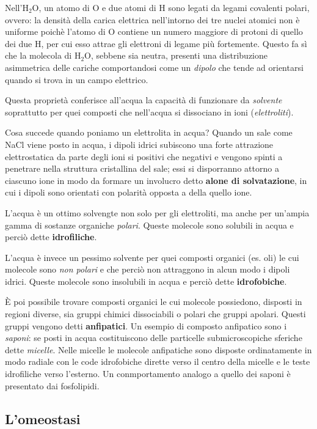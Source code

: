 \documentclass[]{article}
\begin{document}
Nell'H\(_2\)O, un atomo di O e due atomi di H sono legati da legami
covalenti polari, ovvero: la densità della carica elettrica nell'intorno
dei tre nuclei atomici non è uniforme poichè l'atomo di O contiene un
numero maggiore di protoni di quello dei due H, per cui esso attrae gli
elettroni di legame più fortemente. Questo fa sì che la molecola di
H\(_2\)O, sebbene sia neutra, presenti una distribuzione asimmetrica
delle cariche comportandosi come un \emph{dipolo} che tende ad
orientarsi quando si trova in un campo elettrico.

Questa proprietà conferisce all'acqua la capacità di funzionare da
\emph{solvente} soprattutto per quei composti che nell'acqua si
dissociano in ioni (\emph{elettroliti}).

Cosa succede quando poniamo un elettrolita in acqua? Quando un sale come
NaCl viene posto in acqua, i dipoli idrici subiscono una forte
attrazione elettrostatica da parte degli ioni si positivi che negativi e
vengono spinti a penetrare nella struttura cristallina del sale; essi si
disporranno attorno a ciascuno ione in modo da formare un involucro
detto \textbf{alone di solvatazione}, in cui i dipoli sono orientati con
polarità opposta a della quello ione.

L'acqua è un ottimo solvengte non solo per gli elettroliti, ma anche per
un'ampia gamma di sostanze organiche \emph{polari}. Queste molecole sono
solubili in acqua e perciò dette \textbf{idrofiliche}.

L'acqua è invece un pessimo solvente per quei composti organici (es.
oli) le cui molecole sono \emph{non polari} e che perciò non attraggono
in alcun modo i dipoli idrici. Queste molecole sono insolubili in acqua
e perciò dette \textbf{idrofobiche}.

È poi possibile trovare composti organici le cui molecole possiedono,
disposti in regioni diverse, sia gruppi chimici dissociabili o polari
che gruppi apolari. Questi gruppi vengono detti \textbf{anfipatici}. Un
esempio di composto anfipatico sono i \emph{saponi}: se posti in acqua
costituiscono delle particelle submicroscopiche sferiche dette
\emph{micelle}. Nelle micelle le molecole anfipatiche sono disposte
ordinatamente in modo radiale con le code idrofobiche dirette verso il
centro della micelle e le teste idrofiliche verso l'esterno. Un
conmportamento analogo a quello dei saponi è presentato dai fosfolipidi.

\subsection{L'omeostasi}\label{lomeostasi}
\end{document}
